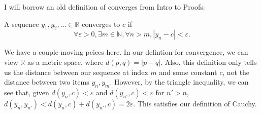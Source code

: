 \documentclass{article}
\newcommand{\R}{\mathbb{R}}
\newcommand{\N}{\mathbb{N}}
\begin{document}
\begin{enumerate}
{\begin{enumerate}
{                I will borrow an old definition of converges from Intro to Proofs:

                A sequence \(y_1, y_2, \dots \in \R\) converges to \(c\) if 
                \[\forall \varepsilon > 0, \exists m \in \N, \forall n > m, |y_n - c| < \varepsilon.\]

                We have a couple moving peices here. In our defintion for convergence, 
                we can view \(\R\) as a metric space, where \(d(p, q) = |p - q|\).
                Also, this definition only tells us the distance between our 
                sequence at index \(m\) and some constant \(c\), not the distance 
                between two items \(y_n, y_m\). However, by the triangle inequality, 
                we can see that, given \(d(y_n, c) < \varepsilon\) and \(d(y_{n'}, c) < \varepsilon\)
                for \(n' > n\), \(d(y_n, y_{n'}) < d(y_n, c) + d(y_{n'}, c) = 2\varepsilon\).
                This satisfies our definition of Cauchy.
            }
        \end{enumerate}
    }
\end{enumerate}
  
\end{document}
